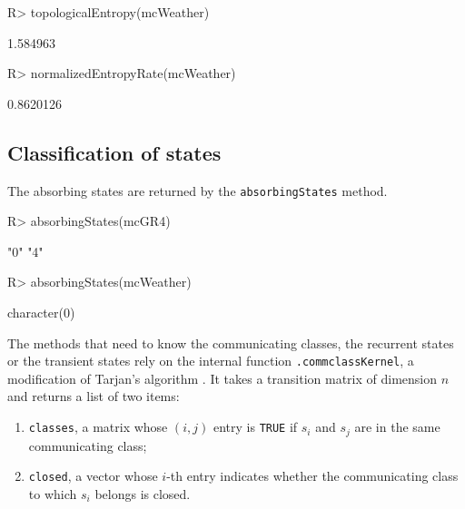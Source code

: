 \documentclass[
  nojss]{jss}
\providecommand{\tightlist}{%
  \setlength{\itemsep}{0pt}\setlength{\parskip}{0pt}}
\begin{document}
\begin{CodeChunk}
\begin{CodeInput}
R> topologicalEntropy(mcWeather)
\end{CodeInput}
\begin{CodeOutput}
[1] 1.584963
\end{CodeOutput}
\begin{CodeInput}
R> normalizedEntropyRate(mcWeather)
\end{CodeInput}
\begin{CodeOutput}
[1] 0.8620126
\end{CodeOutput}
\end{CodeChunk}

\subsection{Classification of states}\label{classification-of-states}

The absorbing states are returned by the \texttt{absorbingStates} method.

\begin{CodeChunk}
\begin{CodeInput}
R> absorbingStates(mcGR4)
\end{CodeInput}
\begin{CodeOutput}
[1] "0" "4"
\end{CodeOutput}
\begin{CodeInput}
R> absorbingStates(mcWeather)
\end{CodeInput}
\begin{CodeOutput}
character(0)
\end{CodeOutput}
\end{CodeChunk}

The methods that need to know the communicating classes, the recurrent states or the transient
states rely on the internal function \texttt{.commclassKernel}, a modification of Tarjan's algorithm \cite{Tarjan}. It takes a transition matrix of dimension \(n\) and returns a list of two items:

\begin{enumerate}
\def\labelenumi{\arabic{enumi}.}
\tightlist
\item
  \texttt{classes}, a matrix whose \((i, j)\) entry is \texttt{TRUE} if \(s_i\) and \(s_j\) are in the same communicating class;
\item
  \texttt{closed}, a vector whose \(i\)-th entry indicates whether the communicating class to which \(s_i\) belongs is closed.
\end{enumerate}
\end{document}
